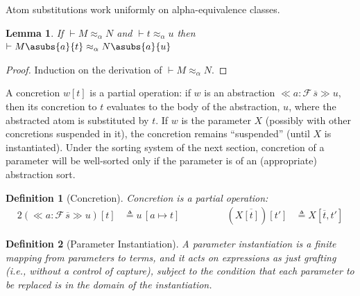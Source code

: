 \documentclass[copyright,creativecommons]{eptcs}
\newtheorem{definition}{Definition}
\newtheorem{lemma}{Lemma}
\newcounter{s}
\newcommand{\absterm}[2]{\ensuremath{\ll\!\!#1\!\!\gg #2}}
\newcommand{\concr}[2]{#1[#2]}
\newcommand{\vect}[1]{\ensuremath{\overline{#1}}}
\newcommand{\sconstr}[2]{\ensuremath{#1\,#2}}
\newcommand {\act}      [0] {\cdot}
\newcommand{\aSub}[3]{\ensuremath{[#1 \mapsto #2]#3}}
\newcommand {\aSubAct} [2] {#1 \, #2}
\newcommand{\varTrmD} [3] {\ensuremath{#3}} %
\newcommand {\susp}    [2] {\ifthenelse{\isempty{#1}}
                                       {\ifthenelse{\isempty{#2}}{}{#2}}
                                       {\ifthenelse{\isempty{#2}}{#1}{#1  | #2}}}
\newcommand {\hsh}      [0] {\#}
\newcommand {\frsh}    [0] {\mathrel{\hsh}}
\newcommand {\al}       [0] {{\approx_\alpha}}
\newcommand {\aleq}     [0] {\mathrel{\al}}
\begin{document}
\noindent
Atom substitutions work uniformly on alpha-equivalence classes.
\begin{lemma}
\label{dependent:aleq_sub}
If $\vdash M \aleq N$ and $\vdash t \aleq u$ then $\vdash M\asubs{a}{t} \aleq N\asubs{a}{u}$
\end{lemma}
\begin{proof}
Induction on the derivation of $\vdash M \aleq N$.
\end{proof}

A concretion $\concr{w}{t}$ is a partial operation: if $w$ is an abstraction $\absterm{a:\sconstr{\mathcal{F}}{\vect{s}}}{u}$, then its concretion to $t$ evaluates to the body of the abstraction, $u$, where the abstracted atom is substituted by $t$.
If $w$ is the parameter $X$ (possibly with other concretions suspended in it), the concretion remains ``suspended'' (until $X$ is instantiated). Under the sorting system of the next section, concretion of a parameter will be well-sorted  only if the parameter is of an (appropriate) abstraction sort.

\begin{definition}[Concretion]
Concretion is a partial operation:
\begin{alignat*}{2}
\concr{(\absterm{a:\sconstr{\mathcal{F}}{\vect{s}}}{u})}{t} & \triangleq \aSubAct{u}{\aSub{a}{t}{}}  %
 & \qquad \qquad
 \concr{(\varTrmD{\vartheta}{\pi}{X} \vect{\concr{}{t}})}{t'} & \triangleq \varTrmD{\vartheta}{\pi}{X} \concr{}{\vect{t},t'}
\end{alignat*}
\end{definition}

\begin{definition}[Parameter Instantiation]
A \emph{parameter instantiation} is a finite mapping from parameters to terms, and it acts on expressions as just grafting (i.e., without a control of capture), subject to the condition that each parameter to be replaced is in the domain of the instantiation.
\end{definition}
\end{document}
